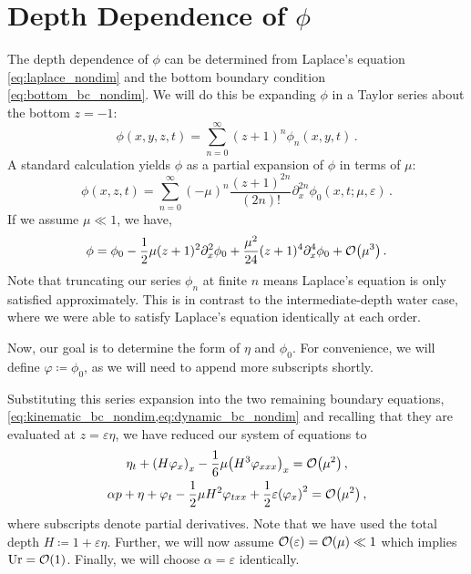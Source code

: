 \documentclass{jfm}
\DeclareMathOperator{\Ur}{Ur}
\renewcommand*{\epsilon}{\varepsilon}
\begin{document}
\section{Depth Dependence of \texorpdfstring{$\phi$}{Velocity Potential}}
The depth dependence of $\phi$ can be determined from Laplace's equation
\cref{eq:laplace_nondim} and the bottom boundary condition
\cref{eq:bottom_bc_nondim}.
We will do this be expanding $\phi$ in a Taylor series about the bottom
$z=-1$:
\begin{equation}
  \phi(x,y,z,t) = \sum_{n=0}^\infty (z+1)^n\phi_n(x,y,t) \,.
\end{equation}
A standard calculation \citep[\eg][]{mei2005nonlinear} yields $\phi$
as a partial expansion of $\phi$ in terms of $\mu$:
\begin{equation}
  \phi(x,z,t) = \sum_{n=0}^{\infty} (-\mu)^n \frac{(z+1)^{2n}}{(2n)!}
  \partial_x^{2n} \phi_0(x,t; \mu, \epsilon) \,.
  \label{eq:phi_expansion}
\end{equation}
If we assume $\mu \ll 1$, we have,
\begin{equation}
  \phi = \phi_0 - \frac{1}{2}\mu (z+1)^2\partial^2_x\phi_0 +
  \frac{\mu^2}{24}(z+1)^4\partial^4_x\phi_0 +
  \order{\mu^3} \,.
\end{equation}
Note that truncating our series $\phi_n$ at finite $n$ means
Laplace's equation is only satisfied approximately.
This is in contrast to the intermediate-depth water case, where we were
able to satisfy Laplace's equation identically at each order.

Now, our goal is to determine the form of $\eta$ and $\phi_0$.
For convenience, we will define $\varphi \coloneqq \phi_0$, as we will
need to append more subscripts shortly.

Substituting this series expansion into the two
remaining boundary equations,
\cref{eq:kinematic_bc_nondim,eq:dynamic_bc_nondim} and recalling that
they are evaluated at $z=\epsilon \eta$, we have reduced our system of
equations to
\begin{gather}
  \eta_t + \pqty{H\varphi_x}_x
    -\frac{1}{6}\mu \pqty{H^3\varphi_{xxx}}_x =
    \order{\mu^2} \label{eq:kinematic_bc_varphi} \,, \\
  \alpha p + \eta + \varphi_t - \frac{1}{2}\mu H^2\varphi_{txx} +
    \frac{1}{2}\epsilon\pqty{\varphi_x}^2 = \order{\mu^2} \,,
  \label{eq:dynamic_bc_varphi}
\end{gather}
where subscripts denote partial derivatives.
Note that we have used the total depth $H\coloneqq 1+\epsilon\eta$.
Further, we will now assume $\order{\epsilon} = \order{\mu} \ll 1$ which
implies $\Ur = \order{1}$.
Finally, we will choose $\alpha = \epsilon$ identically.
\end{document}
